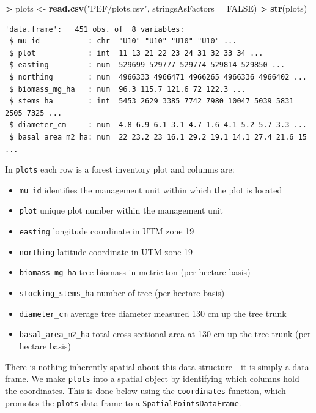 \documentclass[]{krantz}
\makeatletter
\newenvironment{Shaded}{\begin{snugshade}}{\end{snugshade}}
\newcommand{\KeywordTok}[1]{\textcolor[rgb]{0.27,0.27,0.27}{\textbf{#1}}}
\newcommand{\DataTypeTok}[1]{\textcolor[rgb]{0.27,0.27,0.27}{#1}}
\newcommand{\StringTok}[1]{\textcolor[rgb]{0.5,0.5,0.5}{#1}}
\newcommand{\OtherTok}[1]{\textcolor[rgb]{0.37,0.37,0.37}{#1}}
\newcommand{\OperatorTok}[1]{\textcolor[rgb]{0.43,0.43,0.43}{\textbf{#1}}}
\newcommand{\NormalTok}[1]{#1}
\providecommand{\tightlist}{%
  \setlength{\itemsep}{0pt}\setlength{\parskip}{0pt}}
\newenvironment{kframe}{%
\medskip{}
\setlength{\fboxsep}{.8em}
 \def\at@end@of@kframe{}%
 \ifinner\ifhmode%
  \def\at@end@of@kframe{\end{minipage}}%
  \begin{minipage}{\columnwidth}%
 \fi\fi%
 \def\FrameCommand##1{\hskip\@totalleftmargin \hskip-\fboxsep
 \colorbox{shadecolor}{##1}\hskip-\fboxsep
     \hskip-\linewidth \hskip-\@totalleftmargin \hskip\columnwidth}%
 \MakeFramed {\advance\hsize-\width
   \@totalleftmargin\z@ \linewidth\hsize
   \@setminipage}}%
 {\par\unskip\endMakeFramed%
 \at@end@of@kframe}
\renewenvironment{Shaded}{\begin{kframe}}{\end{kframe}}
\theoremstyle{definition}
\theoremstyle{definition}
\theoremstyle{definition}
\theoremstyle{remark}
\makeatother
\begin{document}
\begin{Shaded}
\begin{Highlighting}[]
\OperatorTok{>}\StringTok{ }\NormalTok{plots <-}\StringTok{ }\KeywordTok{read.csv}\NormalTok{(}\StringTok{"PEF/plots.csv"}\NormalTok{, }\DataTypeTok{stringsAsFactors =} \OtherTok{FALSE}\NormalTok{)}
\OperatorTok{>}\StringTok{ }\KeywordTok{str}\NormalTok{(plots)}
\end{Highlighting}
\end{Shaded}

\begin{verbatim}
'data.frame':   451 obs. of  8 variables:
 $ mu_id           : chr  "U10" "U10" "U10" "U10" ...
 $ plot            : int  11 13 21 22 23 24 31 32 33 34 ...
 $ easting         : num  529699 529777 529774 529814 529850 ...
 $ northing        : num  4966333 4966471 4966265 4966336 4966402 ...
 $ biomass_mg_ha   : num  96.3 115.7 121.6 72 122.3 ...
 $ stems_ha        : int  5453 2629 3385 7742 7980 10047 5039 5831 2505 7325 ...
 $ diameter_cm     : num  4.8 6.9 6.1 3.1 4.7 1.6 4.1 5.2 5.7 3.3 ...
 $ basal_area_m2_ha: num  22 23.2 23 16.1 29.2 19.1 14.1 27.4 21.6 15 ...
\end{verbatim}

In \texttt{plots} each row is a forest inventory plot and columns are:

\begin{itemize}
\tightlist
\item
  \texttt{mu\_id} identifies the management unit within which the plot
  is located
\item
  \texttt{plot} unique plot number within the management unit
\item
  \texttt{easting} longitude coordinate in UTM zone 19
\item
  \texttt{northing} latitude coordinate in UTM zone 19
\item
  \texttt{biomass\_mg\_ha} tree biomass in metric ton (per hectare
  basis)
\item
  \texttt{stocking\_stems\_ha} number of tree (per hectare basis)
\item
  \texttt{diameter\_cm} average tree diameter measured 130 cm up the
  tree trunk
\item
  \texttt{basal\_area\_m2\_ha} total cross-sectional area at 130 cm up
  the tree trunk (per hectare basis)
\end{itemize}

There is nothing inherently spatial about this data structure---it is
simply a data frame. We make \texttt{plots} into a spatial object by
identifying which columns hold the coordinates. This is done below using
the \texttt{coordinates} function, which promotes the \texttt{plots}
data frame to a \texttt{SpatialPointsDataFrame}.
\end{document}
